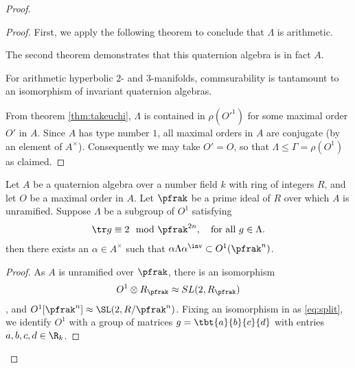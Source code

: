 \begin{proof}
\begin{proof}
    First, we apply the following theorem to conclude that $\Lambda$ is arithmetic.

    The second theorem demonstrates that this quaternion algebra is in fact $A$.

    For arithmetic hyperbolic $2$- and $3$-manifolds, commsurability is tantamount to an isomorphism of invariant quaternion algebras.

    From theorem \ref{thm:takeuchi}, $\Lambda$ is contained in $\rho(O'^1)$ for some maximal order $O'$ in $A$. Since $A$ has type number $1$, all maximal orders in $A$ are conjugate (by an element of $A^\times$). Consequently we may take $O'=O$, so that $\Lambda \leq \Gamma = \rho(O^1)$ as claimed.


  \end{proof}
  \begin{lemma}\label{lemma:MangosteenPicosdeEuropa}
    Let $A$ be a quaternion algebra over a number field $k$ with ring of integers $R$, and let $O$ be a maximal order in $A$.
    Let $\pfrak$ be a prime ideal of $R$ over which $A$ is unramified.
    Suppose $\Lambda$ be a subgroup of $O^1$ satisfying
    \begin{align}\label{eq:trace}
      \tr g \equiv 2 \mod \pfrak^{2n}, \quad \text{for all $g \in \Lambda$}.
    \end{align}
    then there exists an $\alpha \in A^\times$ such that $\alpha \Lambda \alpha^\inv \subset O^1(\pfrak^n)$.
  \end{lemma}
  \begin{proof}


    As $A$ is unramified over $\pfrak$, there is an isomorphism
    \begin{align}\label{eq:split}
      O^1 \otimes R_\pfrak \approx SL(2,R_\pfrak)
    \end{align}, and $O^1[\pfrak^n] \approx \SL(2,R/\pfrak^n)$. Fixing an isomorphism in as \ref{eq:split}, we identify $O^1$ with a group of matrices $g = \tbt{a}{b}{c}{d}$ with entries $a,b,c,d \in \R_k$.


\end{proof}
\end{proof}
